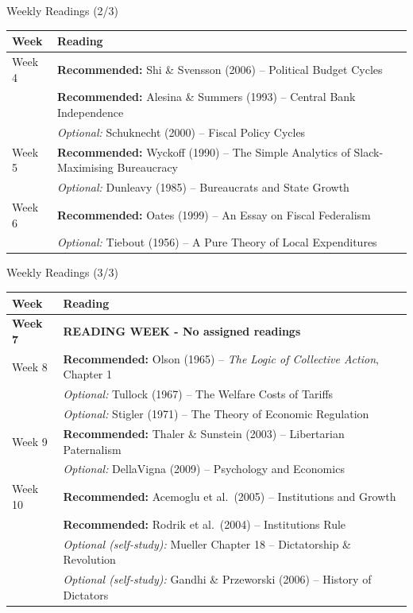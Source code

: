 \documentclass[10pt]{beamer}
\begin{document}
\begin{frame}{Weekly Readings (2/3)}
\small
\begin{tabular}{p{1.5cm}p{8.5cm}}
\toprule
\textbf{Week} & \textbf{Reading} \\
\midrule
Week 4 & \textbf{Recommended:} Shi \& Svensson (2006) -- Political Budget Cycles \\
& \textbf{Recommended:} Alesina \& Summers (1993) -- Central Bank Independence \\
& \textit{Optional:} Schuknecht (2000) -- Fiscal Policy Cycles \\
\addlinespace
Week 5 & \textbf{Recommended:} Wyckoff (1990) -- The Simple Analytics of Slack-Maximising Bureaucracy \\
& \textit{Optional:} Dunleavy (1985) -- Bureaucrats and State Growth \\
\addlinespace
Week 6 & \textbf{Recommended:} Oates (1999) -- An Essay on Fiscal Federalism \\
& \textit{Optional:} Tiebout (1956) -- A Pure Theory of Local Expenditures \\
\bottomrule
\end{tabular}
\end{frame}


\begin{frame}{Weekly Readings (3/3)}
\small
\begin{tabular}{p{1.5cm}p{8.5cm}}
\toprule
\textbf{Week} & \textbf{Reading} \\
\midrule
\textbf{Week 7} & \textbf{READING WEEK - No assigned readings} \\
\addlinespace
Week 8 & \textbf{Recommended:} Olson (1965) -- \textit{The Logic of Collective Action}, Chapter 1 \\
& \textit{Optional:} Tullock (1967) -- The Welfare Costs of Tariffs \\
& \textit{Optional:} Stigler (1971) -- The Theory of Economic Regulation \\
\addlinespace
Week 9 & \textbf{Recommended:} Thaler \& Sunstein (2003) -- Libertarian Paternalism \\
& \textit{Optional:} DellaVigna (2009) -- Psychology and Economics \\
\addlinespace
Week 10 & \textbf{Recommended:} Acemoglu et al.\ (2005) -- Institutions and Growth \\
& \textbf{Recommended:} Rodrik et al.\ (2004) -- Institutions Rule \\
& \textit{Optional (self-study):} Mueller Chapter 18 -- Dictatorship \& Revolution \\
& \textit{Optional (self-study):} Gandhi \& Przeworski (2006) -- History of Dictators \\
\bottomrule
\end{tabular}
\end{frame}
\end{document}
